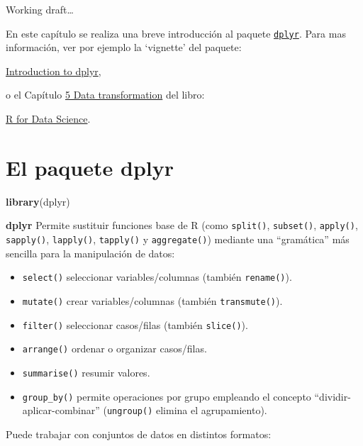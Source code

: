 \documentclass[]{book}
\newenvironment{Shaded}{\begin{snugshade}}{\end{snugshade}}
\newcommand{\KeywordTok}[1]{\textcolor[rgb]{0.13,0.29,0.53}{\textbf{#1}}}
\newcommand{\NormalTok}[1]{#1}
\providecommand{\tightlist}{%
  \setlength{\itemsep}{0pt}\setlength{\parskip}{0pt}}
\begin{document}
Working draft\ldots{}

En este capítulo se realiza una breve introducción al paquete \href{https://dplyr.tidyverse.org/index.html}{\texttt{dplyr}}.
Para mas información, ver por ejemplo la `vignette' del paquete:

\href{https://cran.rstudio.com/web/packages/dplyr/vignettes/dplyr.html}{Introduction to dplyr},

o el Capítulo \href{http://r4ds.had.co.nz/transform.html}{5 Data transformation} del libro:

\href{http://r4ds.had.co.nz}{R for Data Science}.

\hypertarget{el-paquete-dplyr}{%
\section{\texorpdfstring{El paquete \textbf{dplyr}}{El paquete dplyr}}\label{el-paquete-dplyr}}

\begin{Shaded}
\begin{Highlighting}[]
\KeywordTok{library}\NormalTok{(dplyr)}
\end{Highlighting}
\end{Shaded}

\textbf{dplyr} Permite sustituir funciones base de R (como \texttt{split()}, \texttt{subset()},
\texttt{apply()}, \texttt{sapply()}, \texttt{lapply()}, \texttt{tapply()} y \texttt{aggregate()})
mediante una ``gramática'' más sencilla para la manipulación de datos:

\begin{itemize}
\tightlist
\item
  \texttt{select()} seleccionar variables/columnas (también \texttt{rename()}).
\item
  \texttt{mutate()} crear variables/columnas (también \texttt{transmute()}).
\item
  \texttt{filter()} seleccionar casos/filas (también \texttt{slice()}).
\item
  \texttt{arrange()} ordenar o organizar casos/filas.
\item
  \texttt{summarise()} resumir valores.
\item
  \texttt{group\_by()} permite operaciones por grupo empleando el concepto
  ``dividir-aplicar-combinar'' (\texttt{ungroup()} elimina el agrupamiento).
\end{itemize}

Puede trabajar con conjuntos de datos en distintos formatos:
\end{document}

